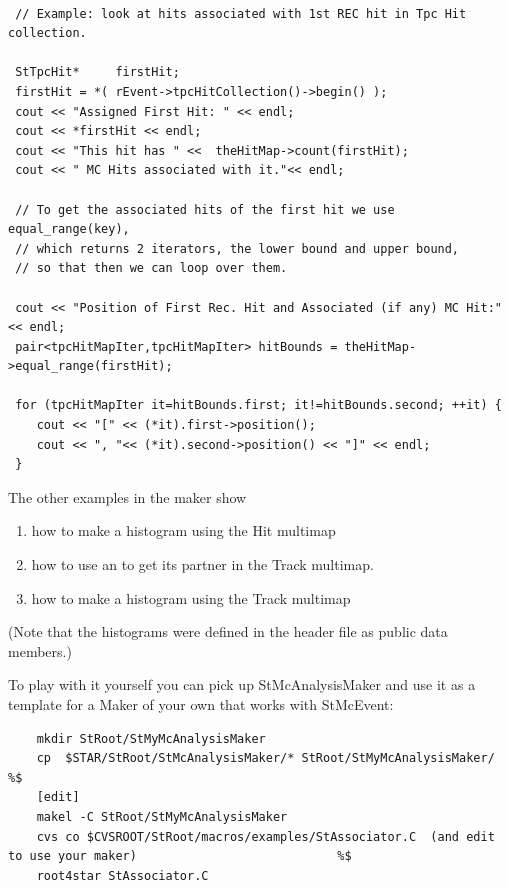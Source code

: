 \begin{verbatim}

 // Example: look at hits associated with 1st REC hit in Tpc Hit collection.

 StTpcHit*     firstHit;
 firstHit = *( rEvent->tpcHitCollection()->begin() );
 cout << "Assigned First Hit: " << endl;
 cout << *firstHit << endl;
 cout << "This hit has " <<  theHitMap->count(firstHit);
 cout << " MC Hits associated with it."<< endl;

 // To get the associated hits of the first hit we use equal_range(key),
 // which returns 2 iterators, the lower bound and upper bound,
 // so that then we can loop over them.
    
 cout << "Position of First Rec. Hit and Associated (if any) MC Hit:" << endl;
 pair<tpcHitMapIter,tpcHitMapIter> hitBounds = theHitMap->equal_range(firstHit);

 for (tpcHitMapIter it=hitBounds.first; it!=hitBounds.second; ++it) {
    cout << "[" << (*it).first->position();
    cout << ", "<< (*it).second->position() << "]" << endl;
 }
\end{verbatim}

The other examples in the maker show
\begin{enumerate}
\item how to make a histogram using the Hit multimap
\item how to use an  to get its partner in the Track multimap.
\item how to make a histogram using the Track multimap
\end{enumerate}

(Note that the histograms were defined in the header file as public data members.)

To play with it yourself you can pick up StMcAnalysisMaker and 
use it as a template for a Maker of your own that works with
StMcEvent:

\begin{verbatim}
    mkdir StRoot/StMyMcAnalysisMaker
    cp  $STAR/StRoot/StMcAnalysisMaker/* StRoot/StMyMcAnalysisMaker/                                   %$
    [edit]
    makel -C StRoot/StMyMcAnalysisMaker
    cvs co $CVSROOT/StRoot/macros/examples/StAssociator.C  (and edit to use your maker)                            %$
    root4star StAssociator.C
\end{verbatim}



